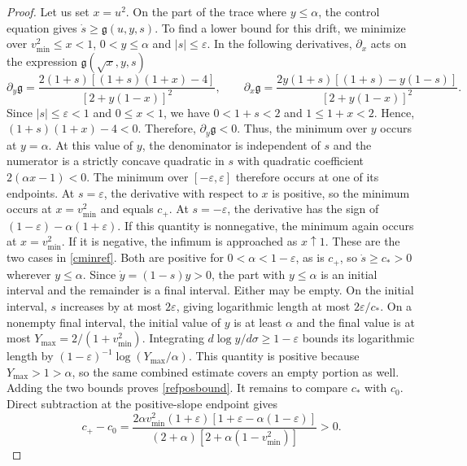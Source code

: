 \documentclass[amsmath,amsfonts,amssymb,aps,pra,superscriptaddress,10pt]{revtex4-2}
\numberwithin{equation}{section}
\theoremstyle{plain}
\theoremstyle{definition}
\theoremstyle{remark}
\theoremstyle{definition}
\begin{document}
\begin{proof}
Let us set $x=u^2$. On the part of the trace where $y\leq\alpha$, the control equation gives $\dot{s}\geq\mathfrak{g}(u,y,s)$. To find a lower bound for this drift, we minimize over $v_{\min}^2\leq x<1$, $0<y\leq\alpha$ and $|s|\leq\varepsilon$. In the following derivatives, $\partial_x$ acts on the expression $\mathfrak{g}(\sqrt{x},y,s)$
\begin{equation}
\partial_y\mathfrak{g}=\frac{2(1+s)[(1+s)(1+x)-4]}{[2+y(1-x)]^2},\qquad
\partial_x\mathfrak{g}=\frac{2y(1+s)[(1+s)-y(1-s)]}{[2+y(1-x)]^2}.
\end{equation}
Since $|s|\leq\varepsilon<1$ and $0\leq x<1$, we have $0<1+s<2$ and $1\leq 1+x<2$. Hence, $(1+s)(1+x)-4<0$. Therefore, $\partial_y\mathfrak{g}<0$. Thus, the minimum over $y$ occurs at $y=\alpha$. At this value of $y$, the denominator is independent of $s$ and the numerator is a strictly concave quadratic in $s$ with quadratic coefficient $2(\alpha x-1)<0$. The minimum over $[-\varepsilon,\varepsilon]$ therefore occurs at one of its endpoints. At $s=\varepsilon$, the derivative with respect to $x$ is positive, so the minimum occurs at $x=v_{\min}^2$ and equals $c_+$. At $s=-\varepsilon$, the derivative has the sign of $(1-\varepsilon)-\alpha(1+\varepsilon)$. If this quantity is nonnegative, the minimum again occurs at $x=v_{\min}^2$. If it is negative, the infimum is approached as $x\uparrow 1$. These are the two cases in \eqref{cminref}. Both are positive for $0<\alpha<1-\varepsilon$, as is $c_+$, so $\dot{s}\geq c_*>0$ wherever $y\leq\alpha$. Since $\dot{y}=(1-s)y>0$, the part with $y\leq\alpha$ is an initial interval and the remainder is a final interval. Either may be empty. On the initial interval, $s$ increases by at most $2\varepsilon$, giving logarithmic length at most $2\varepsilon/c_*$. On a nonempty final interval, the initial value of $y$ is at least $\alpha$ and the final value is at most $Y_{\max}=2/(1+v_{\min}^2)$. Integrating $d\log{y}/d\sigma\geq 1-\varepsilon$ bounds its logarithmic length by $(1-\varepsilon)^{-1}\log{(Y_{\max}/\alpha)}$. This quantity is positive because $Y_{\max}>1>\alpha$, so the same combined estimate covers an empty portion as well. Adding the two bounds proves \eqref{refposbound}. It remains to compare $c_*$ with $c_0$. Direct subtraction at the positive-slope endpoint gives
\begin{equation}
c_+-c_0=\frac{2\alpha v_{\min}^2(1+\varepsilon)
[1+\varepsilon-\alpha(1-\varepsilon)]}{(2+\alpha)[2+\alpha(1-v_{\min}^2)]}>0.
\end{equation}

\end{proof}
\end{document}

